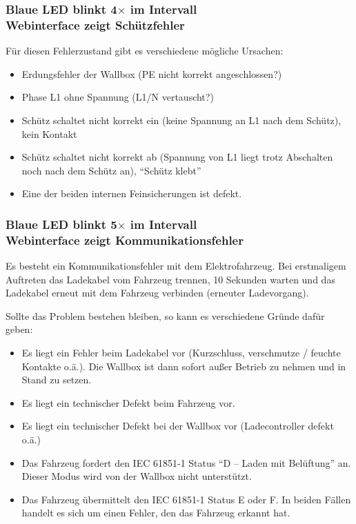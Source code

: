 \documentclass[a4paper,10pt]{article}
\begin{document}
\begin{multicols*}{2}
    \subsubsection*{Blaue LED blinkt 4$\times$ im Intervall \\ Webinterface zeigt Schützfehler}
    Für diesen Fehlerzustand gibt es verschiedene mögliche Ursachen:
    \begin{itemize}
        \item Erdungsfehler der Wallbox (PE nicht korrekt angeschlossen?)
        \item Phase L1 ohne Spannung (L1/N vertauscht?)
        \item Schütz schaltet nicht korrekt ein (keine Spannung an L1 nach dem Schütz), kein
              Kontakt
        \item Schütz schaltet nicht korrekt ab (Spannung von L1 liegt trotz Abschalten noch
              nach dem Schütz an), \enquote{Schütz klebt}
        \item Eine der beiden internen Feinsicherungen ist defekt.
    \end{itemize}

    \subsubsection*{Blaue LED blinkt 5$\times$ im Intervall \\ Webinterface zeigt Kommunikationsfehler}
    Es besteht ein Kommunikationsfehler mit dem Elektrofahrzeug. Bei erstmaligem
    Auftreten das Ladekabel vom Fahrzeug trennen, 10 Sekunden warten und das
    Ladekabel erneut mit dem Fahrzeug verbinden (erneuter Ladevorgang).

    Sollte das Problem bestehen bleiben, so kann es verschiedene Gründe dafür
    geben:
    \begin{itemize}
        \item Es liegt ein Fehler beim Ladekabel vor (Kurzschluss, verschmutze / feuchte
              Kontakte o.ä.). Die Wallbox ist dann sofort außer Betrieb zu nehmen und
              in Stand zu setzen.
        \item Es liegt ein technischer Defekt beim Fahrzeug vor.
        \item Es liegt ein technischer Defekt bei der Wallbox vor (Ladecontroller defekt o.ä.)
        \item Das Fahrzeug fordert den IEC 61851-1 Status \enquote{D – Laden mit Belüftung}
              an. Dieser Modus wird von der Wallbox nicht unterstützt.
        \item Das Fahrzeug übermittelt den IEC 61851-1 Status E oder F. In beiden Fällen
              handelt es sich um einen Fehler, den das Fahrzeug erkannt hat.
    \end{itemize}


\end{multicols*}
\end{document}
